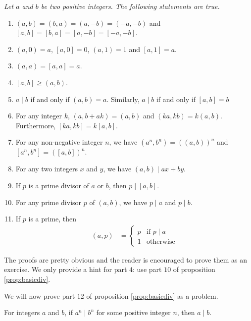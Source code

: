\documentclass{subfile}
\begin{document}
	\begin{proposition}\slshape\label{prop:basicgcd}
		Let $a$ and $b$ be two positive integers. The following statements are true.
		\begin{enumerate}
			\item 	$(a, b) = (b, a) = (a, -b) = (-a, -b)$ and $[a, b]=[b, a] = [a, -b] = [-a, -b]$.
			\item 	$(a,0)=a$, $[a,0]=0$, $(a,1)=1$ and $[a,1]=a$.
			\item 	$(a,a)=[a,a] = a$.
			\item   $[a,b] \geq (a,b)$.
			\item	$a\mid b$ if and only if $(a,b)=a$. Similarly, $a\mid b$ if and only if $[a,b]=b$
			\item   For any integer $k$, $ (a, b+ak) = (a, b)$ and $(ka,kb)=k(a,b)$. Furthermore, $[ka,kb]=k[a,b]$.
			\item   For any non-negative integer $n$, we have $(a^n,b^n)=\left((a,b)\right)^n$ and $[a^n,b^n]=\left([a,b]\right)^n$.
			\item 	For any two integers $x$ and $y$, we have $(a,b)\mid ax+by$.
			\item 	If $p$ is a prime divisor of $a$ or $b$, then $p\mid [a,b]$.
			\item 	For any prime divisor $p$ of $(a, b)$, we have $p\mid a$ and $p\mid b$.
			\item 	If $p$ is a prime, then
			\begin{align*}
				(a,p) & =
				\begin{cases}
					p & \mbox{if } p\mid a\\
					1 & \mbox{otherwise}
				\end{cases}
			\end{align*}
		\end{enumerate}
	\end{proposition}

	The proofs are pretty obvious and the reader is encouraged to prove them as an exercise. We only provide a hint for part $4$: use part $10$ of proposition \eqref{prop:basicdiv}.

	We will now prove part $12$ of proposition \eqref{prop:basicdiv} as a problem.

	\begin{problem}
		For integers $a$ and $b$, if $a^n \mid b^n$ for some positive integer $n$, then $a\mid b$.
	\end{problem}
\end{document}
